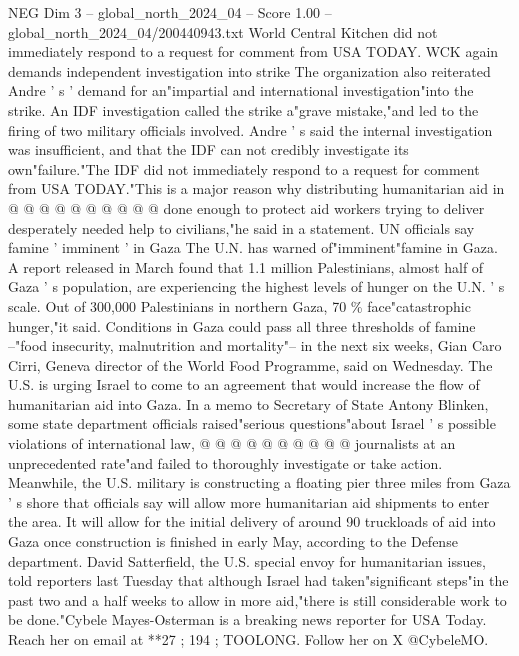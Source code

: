 \begin{textsample}{NEG Dim 3 – global\_north\_2024\_04 – Score 1.00 – global\_north\_2024\_04/200440943.txt}
World Central Kitchen did not immediately respond to a request for comment from USA TODAY.
WCK again demands independent investigation into strike The organization also reiterated Andre ' s ' demand for an"impartial and international investigation"into the strike.
An IDF investigation called the strike a"grave mistake,"and led to the firing of two military officials involved.
Andre ' s said the internal investigation was insufficient, and that the IDF can not credibly investigate its own"failure."The IDF did not immediately respond to a request for comment from USA TODAY."This is a major reason why distributing humanitarian aid in @ @ @ @ @ @ @ @ @ @ done enough to protect aid workers trying to deliver desperately needed help to civilians,"he said in a statement.
UN officials say famine ' imminent ' in Gaza The U.N. has warned of"imminent"famine in Gaza.
A report released in March found that 1.1 million Palestinians, almost half of Gaza ' s population, are experiencing the highest levels of hunger on the U.N. ' s scale.
Out of 300,000 Palestinians in northern Gaza, 70 \% face"catastrophic hunger,"it said.
Conditions in Gaza could pass all three thresholds of famine --"food insecurity, malnutrition and mortality"-- in the next six weeks, Gian Caro Cirri, Geneva director of the World Food Programme, said on Wednesday.
The U.S. is urging Israel to come to an agreement that would increase the flow of humanitarian aid into Gaza.
In a memo to Secretary of State Antony Blinken, some state department officials raised"serious questions"about Israel ' s possible violations of international law, @ @ @ @ @ @ @ @ @ @ journalists at an unprecedented rate"and failed to thoroughly investigate or take action.
Meanwhile, the U.S. military is constructing a floating pier three miles from Gaza ' s shore that officials say will allow more humanitarian aid shipments to enter the area.
It will allow for the initial delivery of around 90 truckloads of aid into Gaza once construction is finished in early May, according to the Defense department.
David Satterfield, the U.S. special envoy for humanitarian issues, told reporters last Tuesday that although Israel had taken"significant steps"in the past two and a half weeks to allow in more aid,"there is still considerable work to be done."Cybele Mayes-Osterman is a breaking news reporter for USA Today.
Reach her on email at **27 ; 194 ; TOOLONG.
Follow her on X @CybeleMO.

\end{textsample}
